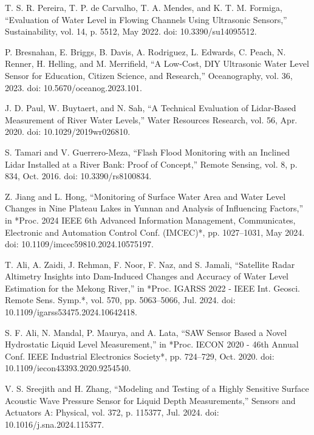 \begin{thebibliography}{00}
 T. S. R. Pereira, T. P. de Carvalho, T. A. Mendes, and K. T. M. Formiga, 
``Evaluation of Water Level in Flowing Channels Using Ultrasonic Sensors,'' 
Sustainability, vol. 14, p. 5512, May 2022. doi: 10.3390/su14095512.

 P. Bresnahan, E. Briggs, B. Davis, A. Rodriguez, L. Edwards, C. Peach, N. Renner, H. Helling, and M. Merrifield, 
``A Low-Cost, DIY Ultrasonic Water Level Sensor for Education, Citizen Science, and Research,'' 
Oceanography, vol. 36, 2023. doi: 10.5670/oceanog.2023.101.

 J. D. Paul, W. Buytaert, and N. Sah, 
``A Technical Evaluation of Lidar-Based Measurement of River Water Levels,'' 
Water Resources Research, vol. 56, Apr. 2020. doi: 10.1029/2019wr026810.

 S. Tamari and V. Guerrero-Meza, 
``Flash Flood Monitoring with an Inclined Lidar Installed at a River Bank: Proof of Concept,'' 
Remote Sensing, vol. 8, p. 834, Oct. 2016. doi: 10.3390/rs8100834.

 Z. Jiang and L. Hong, 
``Monitoring of Surface Water Area and Water Level Changes in Nine Plateau Lakes in Yunnan and Analysis of Influencing Factors,'' 
in *Proc. 2024 IEEE 6th Advanced Information Management, Communicates, Electronic and Automation Control Conf. (IMCEC)*, 
pp. 1027--1031, May 2024. doi: 10.1109/imcec59810.2024.10575197.

 T. Ali, A. Zaidi, J. Rehman, F. Noor, F. Naz, and S. Jamali, 
``Satellite Radar Altimetry Insights into Dam-Induced Changes and Accuracy of Water Level Estimation for the Mekong River,'' 
in *Proc. IGARSS 2022 - IEEE Int. Geosci. Remote Sens. Symp.*, vol. 570, pp. 5063--5066, Jul. 2024. 
doi: 10.1109/igarss53475.2024.10642418.

 S. F. Ali, N. Mandal, P. Maurya, and A. Lata, 
``SAW Sensor Based a Novel Hydrostatic Liquid Level Measurement,'' 
in *Proc. IECON 2020 - 46th Annual Conf. IEEE Industrial Electronics Society*, pp. 724--729, Oct. 2020. 
doi: 10.1109/iecon43393.2020.9254540.

 V. S. Sreejith and H. Zhang, 
``Modeling and Testing of a Highly Sensitive Surface Acoustic Wave Pressure Sensor for Liquid Depth Measurements,'' 
Sensors and Actuators A: Physical, vol. 372, p. 115377, Jul. 2024. doi: 10.1016/j.sna.2024.115377.


\end{thebibliography}
